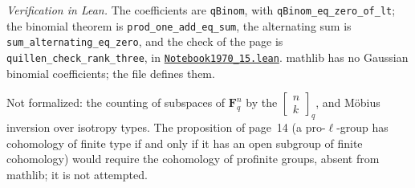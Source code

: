 \begin{sloppypar}
\noindent\emph{Verification in Lean.} The coefficients are \texttt{qBinom}, with \texttt{qBinom\_eq\_zero\_of\_lt}; the binomial theorem is \texttt{prod\_one\_add\_eq\_sum}, the alternating sum is \texttt{sum\_alternating\_eq\_zero}, and the check of the page is \texttt{quillen\_check\_rank\_three}, in \href{\leanblobmain/Notebook1970_15.lean}{\texttt{Notebook1970\_15.\allowbreak{}lean}}. mathlib has no Gaussian binomial coefficients; the file defines them.
\end{sloppypar}

Not formalized: the counting of subspaces of $\mathbf F_q^n$ by the $\left[\begin{smallmatrix} n \\ k \end{smallmatrix}\right]_q$, and Möbius inversion over isotropy types. The proposition of page~14 (a pro-$\ell$-group has cohomology of finite type if and only if it has an open subgroup of finite cohomology) would require the cohomology of profinite groups, absent from mathlib; it is not attempted.

